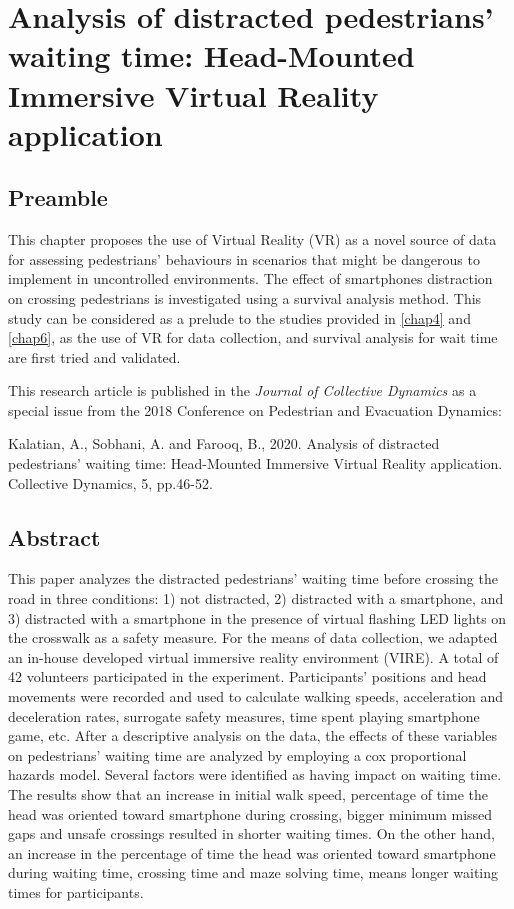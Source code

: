 \chapter{Analysis of distracted pedestrians’ waiting time: Head-Mounted Immersive Virtual Reality application}
\label{chap3}
\thispagestyle{empty}
\pagebreak
\section*{Preamble}
This chapter proposes the use of Virtual Reality (VR) as a novel source of data for assessing pedestrians' behaviours in scenarios that might be dangerous to implement in uncontrolled environments. The effect of smartphones distraction on crossing pedestrians is investigated using a survival analysis method. This study can be considered as a prelude to the studies provided in \cref{chap4} and \cref{chap6}, as the use of VR for data collection, and survival analysis for wait time are first tried and validated.

\vspace{1em} 
\noindent
This research article is published in the \textit{Journal of Collective Dynamics} as a special issue from the 2018 Conference on Pedestrian and Evacuation Dynamics: 

\vspace{1em}
\noindent
Kalatian, A., Sobhani, A. and Farooq, B., 2020. Analysis of distracted pedestrians’ waiting time: Head-Mounted Immersive Virtual Reality application. Collective Dynamics, 5, pp.46-52.
\clearpage

\section*{Abstract}
This paper analyzes the distracted pedestrians’ waiting time before crossing the road in three conditions: 1) not distracted, 2) distracted with a smartphone, and 3) distracted with a smartphone in the presence of virtual flashing LED lights on the crosswalk as a safety measure. For the means of data collection, we adapted an in-house developed virtual immersive reality environment (VIRE). A total of 42 volunteers participated in the experiment. Participants’ positions and head movements were recorded and used to calculate walking speeds, acceleration and deceleration rates, surrogate safety measures, time spent playing smartphone game, etc. After a descriptive analysis on the data, the effects of these variables on pedestrians’ waiting time are analyzed by employing a cox proportional hazards model. Several factors were identified as having impact on waiting time. The results show that an increase in initial walk speed, percentage of time the head was oriented toward smartphone during crossing, bigger minimum missed gaps and unsafe crossings resulted in shorter waiting times. On the other hand, an increase in the percentage of time the head was oriented toward smartphone during waiting time, crossing time and maze solving time, means longer waiting times for participants.
\clearpage


